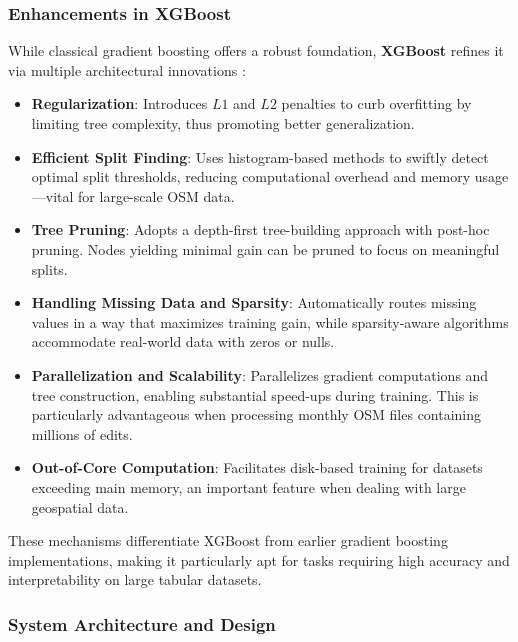 \documentclass[
    13pt, %
    a4paper, %
    DIV14, %
    listof=totoc, %
    bibliography=totoc, %
    index=totoc, %
    headsepline
]{scrreprt}
\begin{document}
\subsubsection{Enhancements in XGBoost}
\label{sec:xgboost_enhancements}

\noindent
While classical gradient boosting offers a robust foundation, \textbf{XGBoost} refines it via multiple architectural innovations \cite{chen2016xgboost}:

\begin{itemize}
    \item \textbf{Regularization}:
    Introduces $L1$ and $L2$ penalties to curb overfitting by limiting tree complexity, thus promoting better generalization.

    \item \textbf{Efficient Split Finding}:
    Uses histogram-based methods to swiftly detect optimal split thresholds, reducing computational overhead and memory usage—vital for large-scale OSM data.

    \item \textbf{Tree Pruning}:
    Adopts a depth-first tree-building approach with post-hoc pruning. Nodes yielding minimal gain can be pruned to focus on meaningful splits.

    \item \textbf{Handling Missing Data and Sparsity}:
    Automatically routes missing values in a way that maximizes training gain, while sparsity-aware algorithms accommodate real-world data with zeros or nulls.

    \item \textbf{Parallelization and Scalability}:
    Parallelizes gradient computations and tree construction, enabling substantial speed-ups during training. This is particularly advantageous when processing monthly OSM files containing millions of edits.

    \item \textbf{Out-of-Core Computation}:
    Facilitates disk-based training for datasets exceeding main memory, an important feature when dealing with large geospatial data.
\end{itemize}

\noindent
These mechanisms differentiate XGBoost from earlier gradient boosting implementations, making it particularly apt for tasks requiring high accuracy and interpretability on large tabular datasets.

\subsubsection{System Architecture and Design}
\label{sec:xgboost_architecture}
\end{document}
